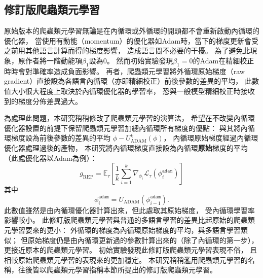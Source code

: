 \subsection{修訂版爬蟲類元學習}
原始版本的爬蟲類元學習\cite{nichol2018first}無論是在內循環或外循環的開頭都不會重新啟動內循環的優化器，
當使用有動能（momentum）的優化器如Adam時，當下的梯度更新會受之前用其他語言計算而得的梯度影響，
造成語言間不必要的干擾。
為了避免此現象，原作者將一階動能項$\beta_{1}$設為$0$。
然而初始實驗發現$\beta_{1} = 0$的Adam在精細校正時時會對準確率造成負面影響。
再者，爬蟲類元學習將外循環原始梯度（raw gradient）直接設為各語言內循環（亦即精細校正）前後參數的差異的平均，
此數值大小很大程度上取決於內循環優化器的學習率，
恐與一般模型精細校正時接收到的梯度分佈差異過大。

為處理此問題，本研究稍稍修改了爬蟲類元學習的演算法，
希望在不改變內循環優化器設置的前提下保留爬蟲類元學習加總內循環所有梯度的優點：
與其將內循環梯度設為前後參數的差異的平均 $\phi - U_{\textrm{ADAM}}^{k}(\phi) $，
內循環原始梯度經過內循環優化器處理過後的產物，
本研究將內循環梯度直接設為內循環\textbf{原始}梯度的平均（此處優化器以Adam為例）：
\begin{equation}
    g_{\textrm{REP}} = \mathbb{E}_{\tau}\left[ \frac{1}{k} \sum_{i=1}^{k} \nabla_{\phi_{i}} \mathcal{L}_{\tau} \left( \phi_{i}^{\texttt{adam}} \right) \right]
\end{equation}
其中
\begin{equation}
    \phi_{i}^{\texttt{adam}} = U_{\textrm{ADAM}} \left( \phi_{i - 1}^{\texttt{adam}} \right).
\end{equation}
此數值雖然是由內循環優化器計算出來，但此處取其原始梯度，
受內循環學習率影響較小。
此修訂版爬蟲類元學習與普通的多語言學習的差異比起原始的爬蟲類元學習要來的更小：
外循環的梯度為內循環原始梯度的平均，與多語言學習類似；
但原始梯度仍是由內循環更新過的參數計算出來的（除了內循環的第一步），更接近原本的爬蟲類元學習。
初始實驗發現此修訂版爬蟲類元學習表現不俗，
且相較原始爬蟲類元學習的表現來的更加穩定。
本研究稍稍濫用爬蟲類元學習的名稱，往後皆以爬蟲類元學習指稱本節所提出的修訂版爬蟲類元學習。

